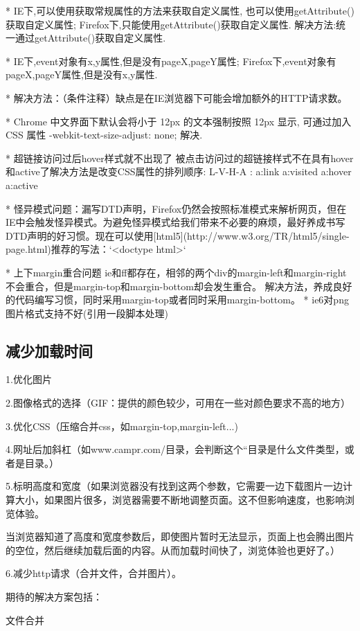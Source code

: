 *  IE下,可以使用获取常规属性的方法来获取自定义属性,
   也可以使用getAttribute()获取自定义属性;
   Firefox下,只能使用getAttribute()获取自定义属性. 
   解决方法:统一通过getAttribute()获取自定义属性.

* IE下,event对象有x,y属性,但是没有pageX,pageY属性; 
  Firefox下,event对象有pageX,pageY属性,但是没有x,y属性.

* 解决方法：（条件注释）缺点是在IE浏览器下可能会增加额外的HTTP请求数。

* Chrome 中文界面下默认会将小于 12px 的文本强制按照 12px 显示, 
  可通过加入 CSS 属性 -webkit-text-size-adjust: none; 解决.

* 超链接访问过后hover样式就不出现了 被点击访问过的超链接样式不在具有hover和active了解决方法是改变CSS属性的排列顺序:
L-V-H-A :  a:link {} a:visited {} a:hover {} a:active {}

* 怪异模式问题：漏写DTD声明，Firefox仍然会按照标准模式来解析网页，但在IE中会触发怪异模式。为避免怪异模式给我们带来不必要的麻烦，最好养成书写DTD声明的好习惯。现在可以使用[html5](http://www.w3.org/TR/html5/single-page.html)推荐的写法：`<doctype html>`

* 上下margin重合问题
ie和ff都存在，相邻的两个div的margin-left和margin-right不会重合，但是margin-top和margin-bottom却会发生重合。
解决方法，养成良好的代码编写习惯，同时采用margin-top或者同时采用margin-bottom。
* ie6对png图片格式支持不好(引用一段脚本处理)


\subsection{减少加载时间}
 1.优化图片 
 
 2.图像格式的选择（GIF：提供的颜色较少，可用在一些对颜色要求不高的地方）
  
 3.优化CSS（压缩合并css，如margin-top,margin-left...) 
 
 4.网址后加斜杠（如www.campr.com/目录，会判断这个“目录是什么文件类型，或者是目录。） 
 
 5.标明高度和宽度（如果浏览器没有找到这两个参数，它需要一边下载图片一边计算大小，如果图片很多，浏览器需要不断地调整页面。这不但影响速度，也影响浏览体验。 
 
当浏览器知道了高度和宽度参数后，即使图片暂时无法显示，页面上也会腾出图片的空位，然后继续加载后面的内容。从而加载时间快了，浏览体验也更好了。） 

6.减少http请求（合并文件，合并图片）。


期待的解决方案包括：

 文件合并
 
